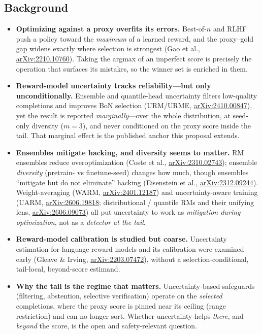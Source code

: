 \documentclass[11pt]{article}
\newcommand{\arxiv}[1]{\href{https://arxiv.org/abs/#1}{arXiv:#1}}
\begin{document}
\subsection{Background}
\begin{itemize}[leftmargin=1.2em,itemsep=3pt]
  \item \textbf{Optimizing against a proxy overfits its errors.} Best-of-$n$ and
    RLHF push a policy toward the \emph{maximum} of a learned reward, and the
    proxy--gold gap widens exactly where selection is strongest (Gao et al.,
    \arxiv{2210.10760}). Taking the argmax of an imperfect score is precisely the
    operation that surfaces its mistakes, so the winner set is enriched in them.
  \item \textbf{Reward-model uncertainty tracks reliability---but only
    unconditionally.} Ensemble and quantile-head uncertainty filters low-quality
    completions and improves BoN selection (URM/URME, \arxiv{2410.00847}), yet the
    result is reported \emph{marginally}---over the whole distribution, at seed-only
    diversity ($m{=}3$), and never conditioned on the proxy score inside the tail.
    That marginal effect is the published anchor this proposal extends.
  \item \textbf{Ensembles mitigate hacking, and diversity seems to matter.} RM
    ensembles reduce overoptimization (Coste et al., \arxiv{2310.02743}); ensemble
    \emph{diversity} (pretrain- vs finetune-seed) changes how much, though ensembles
    ``mitigate but do not eliminate'' hacking (Eisenstein et al., \arxiv{2312.09244}).
    Weight-averaging (WARM, \arxiv{2401.12187}) and uncertainty-aware training (UARM,
    \arxiv{2606.19818}; distributional / quantile RMs and their unifying lens,
    \arxiv{2606.09073}) all put uncertainty to work as \emph{mitigation during
    optimization}, not as a \emph{detector at the tail}.
  \item \textbf{Reward-model calibration is studied but coarse.} Uncertainty
    estimation for language reward models and its calibration were examined early
    (Gleave \& Irving, \arxiv{2203.07472}), without a selection-conditional,
    tail-local, beyond-score estimand.
  \item \textbf{Why the tail is the regime that matters.} Uncertainty-based
    safeguards (filtering, abstention, selective verification) operate on the
    \emph{selected} completions, where the proxy score is pinned near its ceiling
    (range restriction) and can no longer sort. Whether uncertainty helps
    \emph{there}, and \emph{beyond} the score, is the open and safety-relevant
    question.
\end{itemize}
\end{document}
